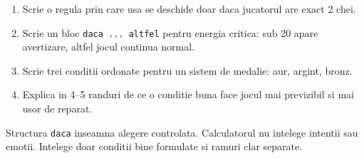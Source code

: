 \begin{solobox}
\begin{enumerate}
\item Scrie o regula prin care usa se deschide doar daca jucatorul are exact 2 chei.
\item Scrie un bloc \texttt{daca ... altfel} pentru energia critica: sub 20 apare avertizare, altfel jocul continua normal.
\item Scrie trei conditii ordonate pentru un sistem de medalie: aur, argint, bronz.
\item Explica in 4--5 randuri de ce o conditie buna face jocul mai previzibil si mai usor de reparat.
\end{enumerate}
\end{solobox}

\begin{checkpointbox}
Structura \texttt{daca} inseamna alegere controlata. Calculatorul nu intelege intentii sau emotii. Intelege doar conditii bine formulate si ramuri clar separate.
\end{checkpointbox}

\clearpage
